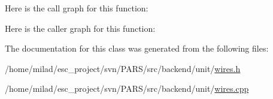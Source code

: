 Here is the call graph for this function:




Here is the caller graph for this function:




The documentation for this class was generated from the following files:\begin{DoxyCompactItemize}
\item 
/home/milad/esc\_\-project/svn/PARS/src/backend/unit/\hyperlink{wires_8h}{wires.h}\item 
/home/milad/esc\_\-project/svn/PARS/src/backend/unit/\hyperlink{wires_8cpp}{wires.cpp}\end{DoxyCompactItemize}

